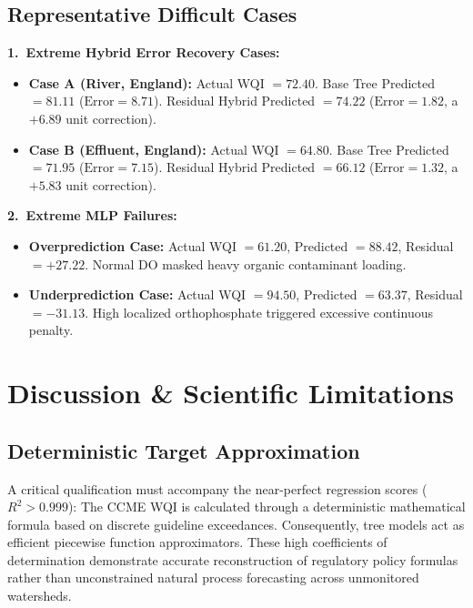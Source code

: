 \documentclass[conference]{IEEEtran}
\begin{document}
\subsection{Representative Difficult Cases}
\noindent\textbf{1.\ Extreme Hybrid Error Recovery Cases:}
\begin{itemize}
  \item \textbf{Case A (River, England):} Actual WQI $= 72.40$. Base Tree Predicted $= 81.11$ ($\text{Error} = 8.71$). Residual Hybrid Predicted $= 74.22$ ($\text{Error} = \mathbf{1.82}$, a $+6.89$ unit correction).
  \item \textbf{Case B (Effluent, England):} Actual WQI $= 64.80$. Base Tree Predicted $= 71.95$ ($\text{Error} = 7.15$). Residual Hybrid Predicted $= 66.12$ ($\text{Error} = \mathbf{1.32}$, a $+5.83$ unit correction).
\end{itemize}

\noindent\textbf{2.\ Extreme MLP Failures:}
\begin{itemize}
  \item \textbf{Overprediction Case:} Actual WQI $= 61.20$, Predicted $= 88.42$, Residual $= \mathbf{+27.22}$. Normal DO masked heavy organic contaminant loading.
  \item \textbf{Underprediction Case:} Actual WQI $= 94.50$, Predicted $= 63.37$, Residual $= \mathbf{-31.13}$. High localized orthophosphate triggered excessive continuous penalty.
\end{itemize}

\section{Discussion \& Scientific Limitations}
\label{sec:limitations}

\subsection{Deterministic Target Approximation}
A critical qualification must accompany the near-perfect regression scores ($R^2 > 0.999$):
The CCME WQI is calculated through a deterministic mathematical formula based on discrete guideline exceedances.
Consequently, tree models act as efficient piecewise function approximators. These high coefficients
of determination demonstrate accurate reconstruction of regulatory policy formulas rather than
unconstrained natural process forecasting across unmonitored watersheds.
\end{document}
